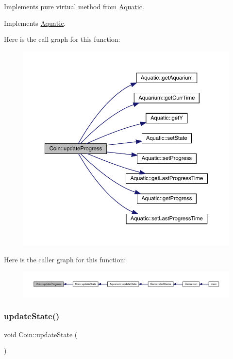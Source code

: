 Implements pure virtual method from \mbox{\hyperlink{class_aquatic}{Aquatic}}. 



Implements \mbox{\hyperlink{class_aquatic_ae1b6301ed27d6aadb73c7ee7879c24af}{Aquatic}}.

Here is the call graph for this function\+:\nopagebreak
\begin{figure}[H]
\begin{center}
\leavevmode
\includegraphics[width=350pt]{class_coin_ac54d7b690f7e415d2220711f718f638e_cgraph}
\end{center}
\end{figure}
Here is the caller graph for this function\+:\nopagebreak
\begin{figure}[H]
\begin{center}
\leavevmode
\includegraphics[width=350pt]{class_coin_ac54d7b690f7e415d2220711f718f638e_icgraph}
\end{center}
\end{figure}
\mbox{\label{class_coin_ac9d03cbd68f9ccb739895832f77d60a3}} 
\subsubsection{\texorpdfstring{update\+State()}{updateState()}}
{\footnotesize\ttfamily void Coin\+::update\+State (\begin{DoxyParamCaption}{ }\end{DoxyParamCaption})\hspace{0.3cm}{\ttfamily [virtual]}}



